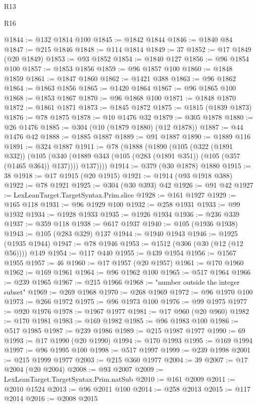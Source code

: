 \begin{lexlean}{R13}
\begin{lexlean}{R16}
\begin{coremodule}
{{{{{{{{{{{{{{{{{{{{{{{{{{{{{{{{{{{{{{{{{{{{{{{{{{{{{{{{{{{{{{{{{{{{{{{{{{{{{{{{{{{{{{{{{{{{{{{{{{{{{{{{{{{{{{{{{@1844 := @132 @1814 @100
@1845 := @1842 @1844
@1846 := @1840 @84
@1847 := @215 @1846
@1848 := @114 @1814
@1849 := 37
@1852 := @17 @1849 (@20 @1849)
@1853 := @93 @1852
@1854 := @1840 @127
@1856 := @96 @1854 @100
@1857 := @1853 @1856
@1859 := @96 @1857 @100
@1860 := @1848 @1859
@1861 := @1847 @1860
@1862 := @1421 @388
@1863 := @96 @1862
@1864 := @1863 @1856
@1865 := @1420 @1864
@1867 := @96 @1865 @100
@1868 := @1853 @1867
@1870 := @96 @1868 @100
@1871 := @1848 @1870
@1872 := @1861 @1871
@1873 := @1845 @1872
@1875 := @1815 (@1839 @1873)
@1876 := @78 @1875
@1878 := @10 @1476 @32
@1879 := @305 @1878
@1880 := @26 @1476
@1885 := @304 (@10 (@1879 @1880) (@12 @1878))
@1887 := @44 @1476 @42
@1888 := @1885 @1887
@1889 := @91 @1887
@1890 := @1889 @116
@1891 := @324 @1887
@1911 := @78
    (@1888
      (@1890
        (@105
          (@322 (@1891 @332))
          (@105
            (@340 (@1889 @343 (@105 (@283 (@1891 @351)) (@105 (@357 (@1465 @364)) @137))))
            @137))))
@1914 := @379 (@30 @1878) @1880
@1915 := 38
@1918 := @17 @1915 (@20 @1915)
@1921 := @1914 (@93 @1918 @388)
@1922 := @78 @1921
@1925 := @304 (@30 @393) @42
@1926 := @91 @42
@1927 := LexLeanTarget.TargetSyntax.Prim.slice
@1928 := @161 @1927
@1929 := @165 @118
@1931 := @96 @1929 @100
@1932 := @258 @1931
@1933 := @99 @1932
@1934 := @1928 @1933
@1935 := @1926 @1934
@1936 := @236 @339
@1937 := @359 @118
@1938 := @617 @1937
@1940 := @105 (@1936 @1938)
@1943 := @105 (@283 @329) @137
@1944 := @1940 @1943
@1946 := @1925 (@1935 @1944)
@1947 := @78 @1946
@1953 := @1512 (@306 (@30 (@12 (@12 @56)))) @149
@1954 := @117 @440
@1955 := @439 @1954
@1956 := @1567 @1955
@1957 := 46
@1960 := @17 @1957 (@20 @1957)
@1961 := @170 @1960
@1962 := @169 @1961
@1964 := @96 @1962 @100
@1965 := @517 @1964
@1966 := @239 @1965
@1967 := @215 @1966
@1968 := "number outside the integer subset"
@1969 := @269 @1968
@1970 := @268 @1969
@1972 := @96 @1970 @100
@1973 := @266 @1972
@1975 := @96 @1973 @100
@1976 := @99 @1975
@1977 := @920 @1976
@1978 := @1967 @1977
@1981 := @17 @960 (@20 @960)
@1982 := @170 @1981
@1983 := @169 @1982
@1985 := @96 @1983 @100
@1986 := @517 @1985
@1987 := @239 @1986
@1989 := @215 @1987 @1977
@1990 := 69
@1993 := @17 @1990 (@20 @1990)
@1994 := @170 @1993
@1995 := @169 @1994
@1997 := @96 @1995 @100
@1998 := @517 @1997
@1999 := @239 @1998
@2001 := @215 @1999 @1977
@2003 := @215 @360 @1977
@2004 := 39
@2007 := @17 @2004 (@20 @2004)
@2008 := @93 @2007
@2009 := LexLeanTarget.TargetSyntax.Prim.natSub
@2010 := @161 @2009
@2011 := @2010 @1524
@2013 := @96 @2011 @100
@2014 := @258 @2013
@2015 := @117 @2014
@2016 := @2008 @2015
}}}}}}}}}}}}}}}}}}}}}}}}}}}}}}}}}}}}}}}}}}}}}}}}}}}}}}}}}}}}}}}}}}}}}}}}}}}}}}}}}}}}}}}}}}}}}}}}}}}}}}}}}}}}}}}}}
\end{coremodule}
\end{lexlean}
\end{lexlean}
